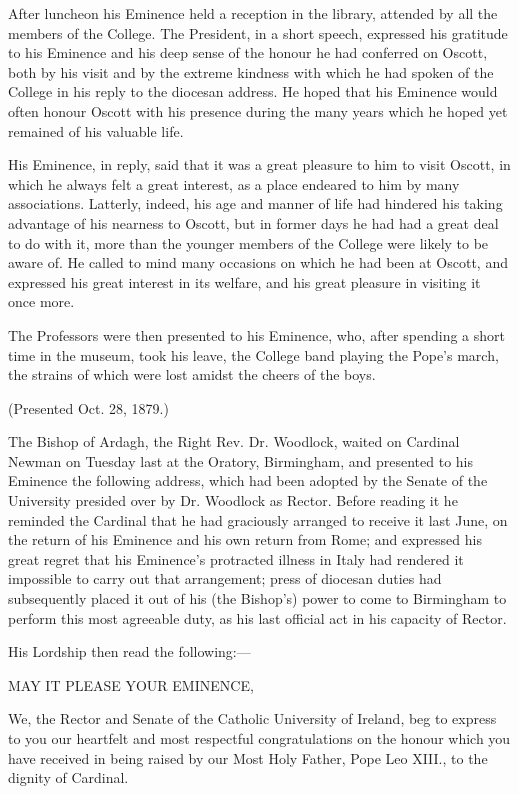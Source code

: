 After luncheon his Eminence held a reception in the library,
attended by all the members of the College. The President, in a short
speech, expressed his gratitude to his Eminence and his deep sense of
the honour he had conferred on Oscott, both by his visit and by the
extreme kindness with which he had spoken of the College in his reply
to the diocesan address. He hoped that his Eminence would often honour
Oscott with his presence during the many years which he hoped yet
remained of his valuable life.

His Eminence, in reply, said that it was a great pleasure to him to
visit Oscott, in which he always felt a great interest, as a place
endeared to him by many associations. Latterly,
indeed, his age and manner of life had hindered his taking advantage
of his nearness to Oscott, but in former days he had had a great deal
to do with it, more than the younger members of the College were
likely to be aware of. He called to mind many occasions on which he
had been at Oscott, and expressed his great interest in its welfare,
and his great pleasure in visiting it once more.

The Professors were then presented to his Eminence, who, after
spending a short time in the museum, took his leave, the College band
playing the Pope's march, the strains of which were lost amidst the
cheers of the boys.


(Presented Oct. 28, 1879.)

The Bishop of Ardagh, the Right Rev. Dr. Woodlock, waited on
Cardinal Newman on Tuesday last at the Oratory, Birmingham, and
presented to his Eminence the following address, which had been
adopted by the Senate of the University presided over by Dr. Woodlock
as Rector. Before reading it he reminded the Cardinal that he had
graciously arranged to receive it last June, on the return of his
Eminence and his own return from Rome; and expressed his great regret
that his Eminence's protracted illness in Italy had rendered it
impossible to carry out that arrangement; press of diocesan duties had
subsequently placed it out of his (the Bishop's) power to come to
Birmingham to perform this most agreeable
duty, as his last official act in his capacity of Rector.

His Lordship then read the following:—

MAY IT PLEASE
YOUR EMINENCE,

We, the Rector and Senate of the Catholic University of Ireland, beg
to express to you our heartfelt and most respectful congratulations on
the honour which you have received in being raised by our Most Holy
Father, Pope Leo XIII., to the dignity of Cardinal.

